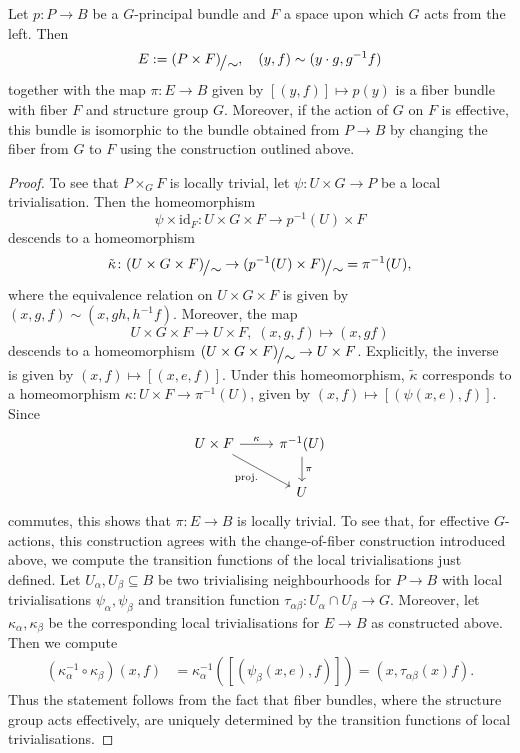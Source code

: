 \begin{lemma}
    \label{bundles:lem:borel_construction}
    Let $p \colon P \to B$ be a $G$-principal bundle and $F$ a space upon which $G$ acts from the left. Then 
    \[
    E := \modulo{(P \times F)}{\sim}, \quad (y,f) \sim (y\cdot g, g^{-1}f)
    \]
    together with the map $\pi \colon E \to B$ given by $[(y,f)] \mapsto p(y)$ is a fiber bundle with fiber $F$ and structure group $G$. Moreover, if the action of $G$ on $F$ is effective, this bundle is isomorphic to the bundle obtained from $P \to B$ by changing the fiber from $G$ to $F$ using the construction outlined above.
\end{lemma}

\begin{proof}
    To see that $P \times_G F$ is locally trivial, let $\psi \colon U \times G \to P$ be a local trivialisation. Then the homeomorphism 
    \[
    \psi \times \mathrm{id}_F \colon U \times G \times F \to p^{-1}(U) \times F
    \]
    descends to a homeomorphism
    \[
    \tilde{\kappa} \colon \modulo{(U \times G \times F)}{\sim} \to \modulo{(p^{-1}(U) \times F)}{\sim} = \pi^{-1}(U),
    \]
    where the equivalence relation on $U \times G \times F$ is given by $(x,g,f) \sim (x,gh,h^{-1}f)$. Moreover, the map 
    \[
    U \times G \times F \to U \times F, \; (x,g,f) \mapsto (x,gf)
    \]
    descends to a homeomorphism $\modulo{(U \times G \times F)}{\sim} \to U \times F$. Explicitly, the inverse is given by $(x,f) \mapsto [(x,e,f)]$. Under this homeomorphism, $\tilde{\kappa}$ corresponds to a homeomorphism $\kappa \colon U \times F \to \pi^{-1}(U)$, given by $(x,f) \mapsto [(\psi(x,e),f)]$. Since
    \[\begin{tikzcd}
	{U \times F} & {\pi^{-1}(U)} \\
	{} & U
	\arrow["{\kappa}", from=1-1, to=1-2]
	\arrow["{\mathrm{proj.}}"', from=1-1, to=2-2]
    \arrow["\pi", from=1-2, to=2-2]
    \end{tikzcd}\]
    commutes, this shows that $\pi \colon E \to B$ is locally trivial. To see that, for effective $G$\nobreakdash-actions, this construction agrees with the change-of-fiber construction introduced above, we compute the transition functions of the local trivialisations just defined. Let $U_\alpha, U_\beta \subseteq B$ be two trivialising neighbourhoods for $P \to B$ with local trivialisations $\psi_\alpha, \psi_\beta$ and transition function $\tau_{\alpha\beta} \colon U_\alpha \cap U_\beta \to G$. Moreover, let $\kappa_\alpha, \kappa_\beta$ be the corresponding local trivialisations for $E \to B$ as constructed above. Then we compute 
    \begin{align*}
        (\kappa_\alpha^{-1} \circ \kappa_\beta)(x,f) & = \kappa_\alpha^{-1}([(\psi_\beta(x,e),f)]) = (x,\tau_{\alpha\beta}(x) f).
    \end{align*}
    Thus the statement follows from the fact that fiber bundles, where the structure group acts effectively, are uniquely determined by the transition functions of local trivialisations.
\end{proof}

